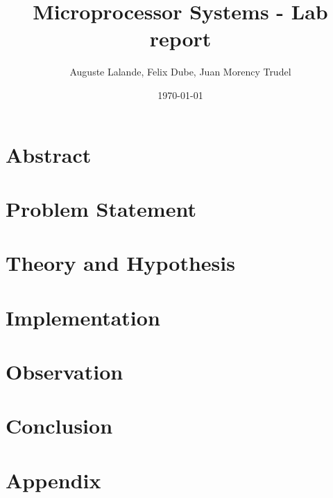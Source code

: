\documentclass[12pt]{article}
\title{Microprocessor Systems - Lab report}
\author{Auguste Lalande, Felix Dube, Juan Morency Trudel}
\date{\today}
\begin{document}
\maketitle
\clearpage

\tableofcontents
\clearpage

\section{Abstract}


\section{Problem Statement}


\section{Theory and Hypothesis}


\section{Implementation}


\section{Observation}

\section{Conclusion}
\newpage

\section{Appendix}
\end{document}

